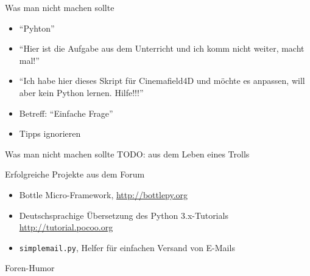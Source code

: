 \documentclass{beamer}
\begin{document}
\begin{frame}{Was man nicht machen sollte}
  \begin{itemize}
    \item \enquote{Pyhton} 
    \item \enquote{Hier ist die Aufgabe aus dem Unterricht und ich komm nicht weiter,
      macht mal!}
    \item \enquote{Ich habe hier dieses Skript für Cinemafield4D und möchte es
      anpassen, will aber kein Python lernen. Hilfe!!!}
    \item Betreff: \enquote{Einfache Frage}
    \item Tipps ignorieren
  \end{itemize}
\end{frame}

\begin{frame}{Was man nicht machen sollte}
  TODO: aus dem Leben eines Trolls
\end{frame}

\begin{frame}{Erfolgreiche Projekte aus dem Forum}
  \begin{itemize}
    \item Bottle Micro-Framework, \url{http://bottlepy.org}
    \item Deutschsprachige Übersetzung des Python 3.x-Tutorials \url{http://tutorial.pocoo.org}
    \item \texttt{simplemail.py}, Helfer für einfachen Versand von E-Mails
  \end{itemize}
\end{frame}

\begin{frame}{Foren-Humor}
\end{frame}
\end{document}
